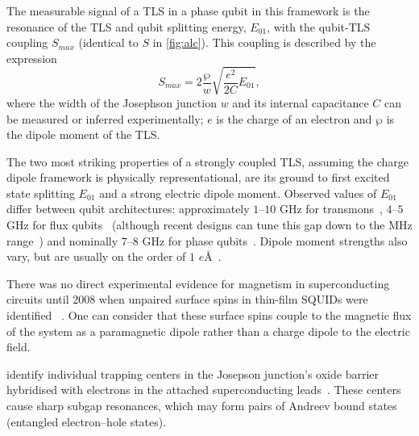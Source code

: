 The measurable signal of a TLS in a phase qubit in this framework is the resonance of the TLS and qubit splitting energy, $E_{01}$, with the qubit-TLS coupling $S_{max}$ (identical to $S$ in \cref{fig:alc}).
This coupling is described by the expression
\begin{equation}
    S_{max}=2\frac{\wp}{w}\sqrt{\frac{e^2}{2C}E_{01}},
\label{eq:smax}
\end{equation}
where the width of the Josephson junction $w$ and its internal capacitance $C$ can be measured or inferred experimentally; $e$ is the charge of an electron and $\wp$ is the dipole moment of the TLS.

The two most striking properties of a strongly coupled TLS, assuming the charge dipole framework is physically representational, are its ground to first excited state splitting $E_{01}$ and a strong electric dipole moment.
Observed values of $E_{01}$  differ between qubit architectures: approximately $1$--$10$ GHz for transmons~\cite{Koch2007}, $4$--$5$ GHz for flux qubits~\cite{Lupascu2009} (although recent designs can tune this gap down to the MHz range~\cite{Schwarz2013}) and nominally $7$--$8$ GHz for phase qubits~\cite{Cole2010}.
Dipole moment strengths also vary, but are usually on the order of $1$ $e$\AA\ \cite{Cole2010,Shalibo2010}.

\divtext

There was no direct experimental evidence for magnetism in superconducting circuits until 2008 when unpaired surface spins in thin-film SQUIDs were identified ~\cite{Sendelbach2008}.
One can consider that these surface spins couple to the magnetic flux of the system as a paramagnetic dipole rather than a charge dipole to the electric field.

\divtext

\citeauthor{DeSousa2009} identify individual trapping centers in the Josepson junction's oxide barrier hybridised with electrons in the attached superconducting leads~\cite{DeSousa2009}.
These centers cause sharp subgap resonances, which may form pairs of Andreev bound states (entangled electron--hole states).

\divtext

